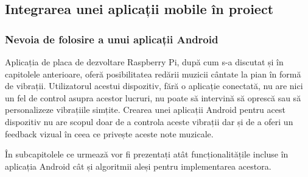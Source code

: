 \documentclass[../IoMusT.tex]{subfiles}
\begin{document}
\subsection{Integrarea unei aplicații mobile în proiect}
\subsubsection{Nevoia de folosire a unui aplicații Android}
Aplicația de placa de dezvoltare Raspberry Pi, după cum s-a discutat și în capitolele anterioare, oferă posibilitatea redării muzicii cântate la pian în formă de vibrații. Utilizatorul acestui dispozitiv, fără o aplicație conectată, nu are nici un fel de control asupra acestor lucruri, nu poate să intervină să oprescă sau să personalizeze vibrațiile simțite. Crearea unei aplicații Android pentru acest dispozitiv nu are scopul doar de a controla aceste vibrații dar și de a oferi un feedback vizual în ceea ce privește aceste note muzicale. 
\\
\par În subcapitolele ce urmează vor fi prezentați atât funcționalitățile incluse în aplicația Android cât și algoritmii aleși pentru implementarea acestora.
\end{document}
